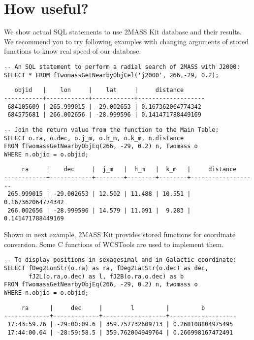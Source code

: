 \section{How useful?}

We show actual SQL statements to use 2MASS Kit database
and their results.
We recommend you to try following examples with changing 
arguments of stored functions to know real speed of our
database.

\begin{verbatim}
-- An SQL statement to perform a radial search of 2MASS with J2000:
SELECT * FROM fTwomassGetNearbyObjCel('j2000', 266,-29, 0.2);
\end{verbatim}

{\small
\begin{verbatim}
   objid   |    lon     |    lat     |     distance      
-----------+------------+------------+-------------------
 684105609 | 265.999015 | -29.002653 | 0.167362064774342
 684575681 | 266.002656 | -28.999596 | 0.141471788449169
\end{verbatim}
}

\begin{verbatim}
-- Join the return value from the function to the Main Table:
SELECT o.ra, o.dec, o.j_m, o.h_m, o.k_m, n.distance
FROM fTwomassGetNearbyObjEq(266, -29, 0.2) n, Twomass o
WHERE n.objid = o.objid;
\end{verbatim}

{\small
\begin{verbatim}
     ra     |    dec     |  j_m   |  h_m   |  k_m   |     distance     
------------+------------+--------+--------+--------+-------------------
 265.999015 | -29.002653 | 12.502 | 11.488 | 10.551 | 0.167362064774342
 266.002656 | -28.999596 | 14.579 | 11.091 |  9.283 | 0.141471788449169
\end{verbatim}
}

Shown in next example,
2MASS Kit provides stored functions for coordinate conversion.
Some C functions of WCSTools \citep{min_2006}
are used to implement them.

\begin{verbatim}
-- To display positions in sexagesimal and in Galactic coordinate:
SELECT fDeg2LonStr(o.ra) as ra, fDeg2LatStr(o.dec) as dec, 
       fJ2L(o.ra,o.dec) as l, fJ2B(o.ra,o.dec) as b
FROM fTwomassGetNearbyObjEq(266, -29, 0.2) n, twomass o
WHERE n.objid = o.objid;
\end{verbatim}

{\small
\begin{verbatim}
     ra      |     dec     |        l         |         b         
-------------+-------------+------------------+-------------------
 17:43:59.76 | -29:00:09.6 | 359.757732609713 | 0.268108804975495
 17:44:00.64 | -28:59:58.5 | 359.762004949764 | 0.266998167472491
\end{verbatim}
}

